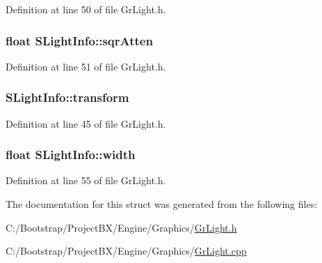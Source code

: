 Definition at line 50 of file GrLight.h.\hypertarget{struct_s_light_info_2d5f5d37ba45e45ca2e311e4d4c04491}{
\subsubsection[{sqrAtten}]{\setlength{\rightskip}{0pt plus 5cm}float {\bf SLightInfo::sqrAtten}}}
\label{struct_s_light_info_2d5f5d37ba45e45ca2e311e4d4c04491}




Definition at line 51 of file GrLight.h.\hypertarget{struct_s_light_info_7c2667c93e4ec8b5bda44f39f97fb629}{
\subsubsection[{transform}]{ {\bf SLightInfo::transform}}}
\label{struct_s_light_info_7c2667c93e4ec8b5bda44f39f97fb629}




Definition at line 45 of file GrLight.h.\hypertarget{struct_s_light_info_0b94e57ebcf7a284530d822145cd62e1}{
\subsubsection[{width}]{\setlength{\rightskip}{0pt plus 5cm}float {\bf SLightInfo::width}}}
\label{struct_s_light_info_0b94e57ebcf7a284530d822145cd62e1}




Definition at line 55 of file GrLight.h.

The documentation for this struct was generated from the following files:\begin{CompactItemize}
\item 
C:/Bootstrap/ProjectBX/Engine/Graphics/\hyperlink{_gr_light_8h}{GrLight.h}\item 
C:/Bootstrap/ProjectBX/Engine/Graphics/\hyperlink{_gr_light_8cpp}{GrLight.cpp}\end{CompactItemize}
